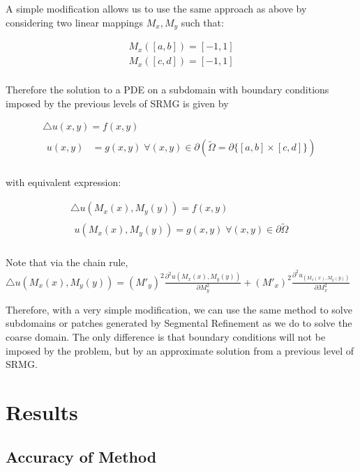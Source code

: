 \documentclass[final]{siamart1116}
\numberwithin{theorem}{section}
\begin{document}
A simple modification allows us to use the same approach as above by considering two linear mappings $M_x, M_y$ such that:

\begin{align*}
M_x([a,b]) = [-1, 1]\\
M_x([c,d]) = [-1, 1]\\
\end{align*}

Therefore the solution to a PDE on a subdomain with boundary conditions imposed by the previous levels of SRMG is given by

\begin{gather}
  \bigtriangleup u(x, y) = f(x, y) \\  
  \begin{split}
    u(x, y) &= g(x, y)  \; \forall (x, y) \in \partial (\tilde{\Omega} = \partial\{[a, b] \times [c, d]\} ) \nonumber \\
  \end{split}
\end{gather}

with equivalent expression: 

\begin{gather}
  \bigtriangleup u(M_x(x), M_y(y)) = f(x, y) \\  
  \begin{split}
    u(M_x(x), M_y(y)) = g(x,y)  \; \forall (x, y) \in  \partial \tilde{\Omega}  \nonumber \\
  \end{split}
\end{gather}

Note that via the chain rule, $\bigtriangleup u(M_x(x), M_y(y)) = (M'_y)^2 \frac{\partial^2 u(M_x(x), M_y(y)) }{\partial M_y^2} + (M'_x)^2 \frac{\partial^2 u_(M_x(x), M_y(y)) }{\partial M_x^2}$    

Therefore, with a very simple modification, we can use the same method to solve subdomains or patches generated by Segmental Refinement as we do to solve the coarse domain. The only difference is that boundary conditions will not be imposed by the problem, but by an approximate solution from a previous level of SRMG. 



\section{Results}\label{sec:results}

\subsection{Accuracy of Method}
\end{document}
